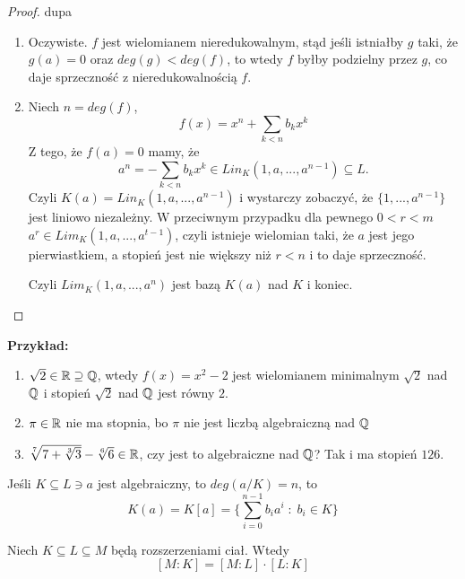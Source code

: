 \begin{proof}{\color{pagColor}dupa}

\begin{enumerate}
\item Oczywiste. $f$ jest wielomianem nieredukowalnym, stąd jeśli istniałby $g$ taki, że $g(a)=0$ oraz $deg(g)<deg(f)$, to wtedy $f$ byłby podzielny przez $g$, co daje sprzeczność z nieredukowalnością $f$.


\item Niech $n=deg(f)$, 
$$f(x)=x^n+\sum\limits_{k<n}b_kx^k$$
Z tego, że $f(a)=0$ mamy, że 
$$a^n=-\sum\limits_{k<n}b_kx^k\in Lin_K(1,a,...,a^{n-1})\subseteq L.$$
Czyli $K(a)=Lin_K(1,a,...,a^{n-1})$ i wystarczy zobaczyć, że $\{1,..., a^{n-1}\}$ jest liniowo niezależny. W przeciwnym przypadku dla pewnego $0<r<m$ $a^r\in Lim_K(1,a,...,a^{t-1})$, czyli istnieje wielomian taki, że $a$ jest jego pierwiastkiem, a stopień jest nie większy niż $r<n$ i to daje sprzeczność.

Czyli $Lim_K(1,a,...,a^n)$ jest bazą $K(a)$ nad $K$ i koniec.
\end{enumerate}
\end{proof}
\textbf{Przykład:}
\begin{enumerate}
    \item $\sqrt{2}\in\mathbb{R}\supseteq\mathbb{Q}$, wtedy $f(x)=x^2-2$ jest wielomianem minimalnym $\sqrt2$ nad $\mathbb{Q}$ i stopień $\sqrt{2}$ nad $\mathbb{Q}$ jest równy $2$.
    \item $\pi\in\mathbb{R}$ nie ma stopnia, bo $\pi$ nie jest liczbą algebraiczną nad $\mathbb{Q}$
    \item  $\sqrt[7]{7+\sqrt[3]{3}}-\sqrt[6]{6}\in\mathbb{R}$, czy jest to algebraiczne nad $\mathbb{Q}$? Tak i ma stopień $126$.
\end{enumerate}

Jeśli $K\subseteq L\ni a$ jest algebraiczny, to $deg(a/K)=n$, to 
$$K(a)=K[a]=\{\sum\limits_{i=0}^{n-1}b_ia^i\;:\;b_i\in K\}$$

\begin{fact}[$dim_K(M)=dim_L(M)\cdot dim_K(L)$]\label{fakt:4:6}
  
    Niech $K\subseteq L\subseteq M$ będą rozszerzeniami ciał. Wtedy 
    $$[M:K]=[M:L]\cdot [L:K]$$
\end{fact}


